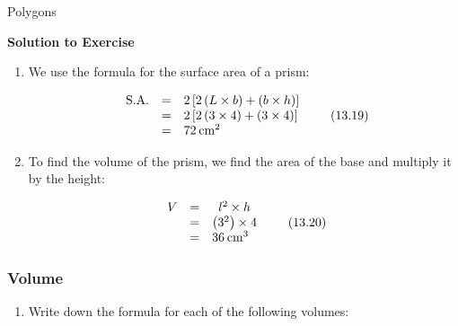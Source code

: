 \begin{exercises}{Polygons}
{\begin{mdframed}[linewidth=4, leftmargin=40, rightmargin=40]
\begin{exercise}
\label{m39357*eip-51}\noindent\textbf{Solution to Exercise }
  \label{m39357*eip-226}\begin{enumerate}[noitemsep, label=\textbf{Step} \textbf{\arabic*}. ] 
            \leftskip=20pt\rightskip=\leftskip\item We use the formula for the surface area of a prism:
      \label{m39357*id1166229703568}\nopagebreak\noindent{}
        
    \begin{equation}
    \begin{array}{ccc}\hfill \mathrm{S.A.}& =& 2\left[2\left(L\ensuremath{\times}b\right)+\left(b\ensuremath{\times}h\right)\right]\hfill \\ & =& 2\left[2\left(3\ensuremath{\times}4\right)+\left(3\ensuremath{\times}4\right)\right]\hfill \\ & =& {72\phantom{\rule{2pt}{0ex}}\mathrm{cm}}^{2}\hfill \end{array}\tag{13.19}
      \end{equation}
    
      \item To find the volume of the prism, we find the area of the base and multiply it by the height:
      \label{m39357*id1166232868439}\nopagebreak\noindent{}
        
    \begin{equation}
    \begin{array}{ccc}V\hfill & =& {l}^{2}\ensuremath{\times}h\\ & =& \left({3}^{2}\right)\ensuremath{\times}4\hfill \\ & =& {36\phantom{\rule{2pt}{0ex}}\mathrm{cm}}^{3}\hfill \end{array}\tag{13.20}
      \end{equation}
    
      \end{enumerate}
        


    \end{exercise}
    \end{mdframed}
    }
    \noindent
  \label{m39357*secfhsst!!!underscore!!!id132}
            \subsubsection{  Volume }
            \nopagebreak
            
        \label{m39357*id63019}\begin{enumerate}[noitemsep, label=\textbf{\arabic*}. ] 
            \label{m39357*uid17}\item Write down the formula for each of the following volumes:


\end{enumerate}
\end{exercises}
